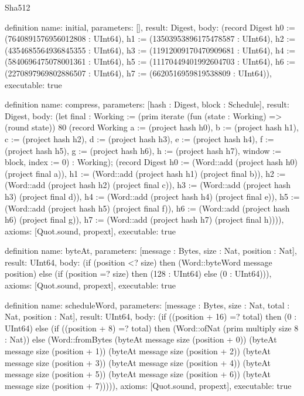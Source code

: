 \begin{lexlean}{Sha512}
\begin{semanticmodule}
definition{
  name: initial,
  parameters: [],
  result: Digest,
  body: (record Digest {h0 := (7640891576956012808 : UInt64), h1 := (13503953896175478587 : UInt64), h2 := (4354685564936845355 : UInt64), h3 := (11912009170470909681 : UInt64), h4 := (5840696475078001361 : UInt64), h5 := (11170449401992604703 : UInt64), h6 := (2270897969802886507 : UInt64), h7 := (6620516959819538809 : UInt64)}),
  executable: true
}

definition{
  name: compress,
  parameters: [hash : Digest, block : Schedule],
  result: Digest,
  body: (let final : Working := (prim iterate (fun (state : Working) => (round state)) 80 (record Working {a := (project hash h0), b := (project hash h1), c := (project hash h2), d := (project hash h3), e := (project hash h4), f := (project hash h5), g := (project hash h6), h := (project hash h7), window := block, index := 0}) : Working); (record Digest {h0 := (Word::add (project hash h0) (project final a)), h1 := (Word::add (project hash h1) (project final b)), h2 := (Word::add (project hash h2) (project final c)), h3 := (Word::add (project hash h3) (project final d)), h4 := (Word::add (project hash h4) (project final e)), h5 := (Word::add (project hash h5) (project final f)), h6 := (Word::add (project hash h6) (project final g)), h7 := (Word::add (project hash h7) (project final h))})),
  axioms: [Quot.sound, propext],
  executable: true
}

definition{
  name: byteAt,
  parameters: [message : Bytes, size : Nat, position : Nat],
  result: UInt64,
  body: (if (position <? size) then (Word::byteWord message position) else (if (position =? size) then (128 : UInt64) else (0 : UInt64))),
  axioms: [Quot.sound, propext],
  executable: true
}

definition{
  name: scheduleWord,
  parameters: [message : Bytes, size : Nat, total : Nat, position : Nat],
  result: UInt64,
  body: (if ((position + 16) =? total) then (0 : UInt64) else (if ((position + 8) =? total) then (Word::ofNat (prim multiply size 8 : Nat)) else (Word::fromBytes (byteAt message size (position + 0)) (byteAt message size (position + 1)) (byteAt message size (position + 2)) (byteAt message size (position + 3)) (byteAt message size (position + 4)) (byteAt message size (position + 5)) (byteAt message size (position + 6)) (byteAt message size (position + 7))))),
  axioms: [Quot.sound, propext],
  executable: true
}


\end{semanticmodule}
\end{lexlean}
